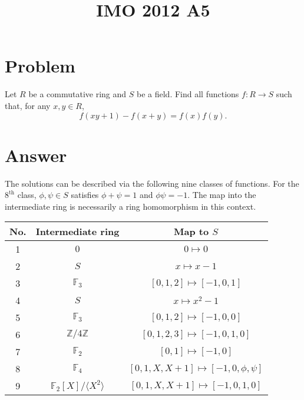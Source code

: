 \documentclass{article}
\title{IMO 2012 A5}
\author{}
\date{}
\newcommand{\F}{\mathbb{F}}
\newcommand{\Z}{\mathbb{Z}}
\begin{document}
\maketitle





\section*{Problem}

Let $R$ be a commutative ring and $S$ be a field.
Find all functions $f : R \to S$ such that, for any $x, y \in R$,
\[ f(xy + 1) - f(x + y) = f(x) f(y). \tag{*}\label{2012a5-eq0} \]



\section*{Answer}

The solutions can be described via the following nine classes of functions.
For the $8^{\text{th}}$ class, $\phi, \psi \in S$ satisfies $\phi + \psi = 1$ and $\phi \psi = -1$.
The map into the intermediate ring is necessarily a ring homomorphism in this context.

\begin{table}[H]
\centering
\begin{tabular}{|c|c|c|}
    \hline
    No. & Intermediate ring & Map to $S$ \\ \hline
    1 & $0$ & $0 \mapsto 0$ \\ \hline
    2 & $S$ & $x \mapsto x - 1$ \\ \hline
    3 & $\F_3$ & $[0, 1, 2] \mapsto [-1, 0, 1]$ \\ \hline
    4 & $S$ & $x \mapsto x^2 - 1$ \\ \hline
    5 & $\F_3$ & $[0, 1, 2] \mapsto [-1, 0, 0]$ \\ \hline
    6 & $\Z/4\Z$ & $[0, 1, 2, 3] \mapsto [-1, 0, 1, 0]$ \\ \hline
    7 & $\F_2$ & $[0, 1] \mapsto [-1, 0]$ \\ \hline
    8 & $\F_4$ & $[0, 1, X, X + 1] \mapsto [-1, 0, \phi, \psi]$ \\ \hline
    9 & $\F_2[X]/\langle X^2 \rangle$ & $[0, 1, X, X + 1] \mapsto [-1, 0, 1, 0]$ \\ \hline
\end{tabular}
\end{table}
\end{document}
